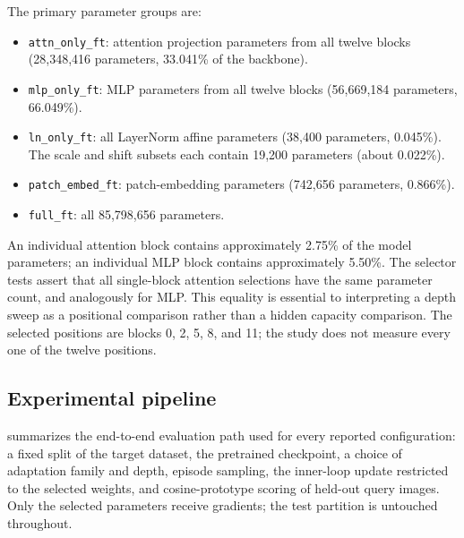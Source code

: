 \documentclass[11pt]{article}
\newcommand{\method}[1]{\texttt{#1}}
\begin{document}
The primary parameter groups are:
\begin{itemize}
  \item \method{attn\_only\_ft}: attention projection parameters from all twelve blocks (28,348,416 parameters, 33.041\% of the backbone).
  \item \method{mlp\_only\_ft}: MLP parameters from all twelve blocks (56,669,184 parameters, 66.049\%).
  \item \method{ln\_only\_ft}: all LayerNorm affine parameters (38,400 parameters, 0.045\%). The scale and shift subsets each contain 19,200 parameters (about 0.022\%).
  \item \method{patch\_embed\_ft}: patch-embedding parameters (742,656 parameters, 0.866\%).
  \item \method{full\_ft}: all 85,798,656 parameters.
\end{itemize}

An individual attention block contains approximately 2.75\% of the model parameters; an individual MLP block contains approximately 5.50\%. The selector tests assert that all single-block attention selections have the same parameter count, and analogously for MLP. This equality is essential to interpreting a depth sweep as a positional comparison rather than a hidden capacity comparison. The selected positions are blocks 0, 2, 5, 8, and 11; the study does not measure every one of the twelve positions.

\subsection{Experimental pipeline}

 summarizes the end-to-end evaluation path used for every reported configuration: a fixed split of the target dataset, the pretrained checkpoint, a choice of adaptation family and depth, episode sampling, the inner-loop update restricted to the selected weights, and cosine-prototype scoring of held-out query images. Only the selected parameters receive gradients; the test partition is untouched throughout.
\end{document}
